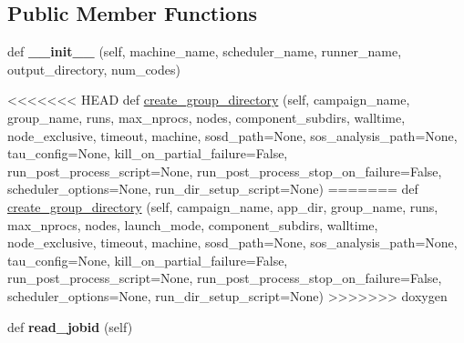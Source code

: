 \subsection*{Public Member Functions}
\begin{DoxyCompactItemize}
\item 
\mbox{\label{classcodar_1_1cheetah_1_1launchers_1_1_launcher_a646b70e47e85def77f4ba1dbfbeb5b34}} 
def {\bfseries \+\_\+\+\_\+init\+\_\+\+\_\+} (self, machine\+\_\+name, scheduler\+\_\+name, runner\+\_\+name, output\+\_\+directory, num\+\_\+codes)
\item 
<<<<<<< HEAD
def \hyperlink{classcodar_1_1cheetah_1_1launchers_1_1_launcher_a96798b79cb86f858f30dfdff1618bfb3}{create\+\_\+group\+\_\+directory} (self, campaign\+\_\+name, group\+\_\+name, runs, max\+\_\+nprocs, nodes, component\+\_\+subdirs, walltime, node\+\_\+exclusive, timeout, machine, sosd\+\_\+path=None, sos\+\_\+analysis\+\_\+path=None, tau\+\_\+config=None, kill\+\_\+on\+\_\+partial\+\_\+failure=False, run\+\_\+post\+\_\+process\+\_\+script=None, run\+\_\+post\+\_\+process\+\_\+stop\+\_\+on\+\_\+failure=False, scheduler\+\_\+options=None, run\+\_\+dir\+\_\+setup\+\_\+script=None)
=======
def \hyperlink{classcodar_1_1cheetah_1_1launchers_1_1_launcher_a961dc12bab6b346c28372995b9873e46}{create\+\_\+group\+\_\+directory} (self, campaign\+\_\+name, app\+\_\+dir, group\+\_\+name, runs, max\+\_\+nprocs, nodes, launch\+\_\+mode, component\+\_\+subdirs, walltime, node\+\_\+exclusive, timeout, machine, sosd\+\_\+path=None, sos\+\_\+analysis\+\_\+path=None, tau\+\_\+config=None, kill\+\_\+on\+\_\+partial\+\_\+failure=False, run\+\_\+post\+\_\+process\+\_\+script=None, run\+\_\+post\+\_\+process\+\_\+stop\+\_\+on\+\_\+failure=False, scheduler\+\_\+options=None, run\+\_\+dir\+\_\+setup\+\_\+script=None)
>>>>>>> doxygen
\item 
\mbox{\label{classcodar_1_1cheetah_1_1launchers_1_1_launcher_af6f838444c55859d67a1ad60fed1198e}} 
def {\bfseries read\+\_\+jobid} (self)
\end{DoxyCompactItemize}
